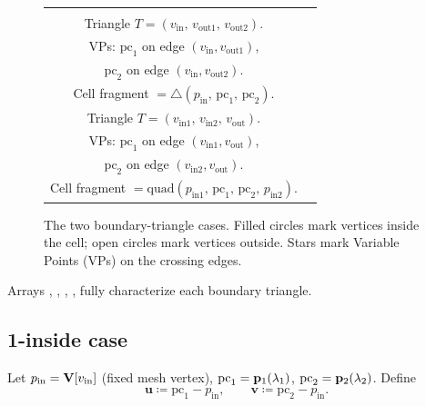 \documentclass[11pt,a4paper]{article}
\begin{document}
\begin{figure}[h]
\centering
\begin{tabular}{cc}
\begin{minipage}{0.45\textwidth}
\centering
\textit{1-inside:}\\[4pt]
Triangle $T = (v_\mathrm{in},\, v_\mathrm{out1},\, v_\mathrm{out2})$.\\
VPs: $\mathrm{pc}_1$ on edge $(v_\mathrm{in}, v_\mathrm{out1})$,\\
\phantom{VPs: }$\mathrm{pc}_2$ on edge $(v_\mathrm{in}, v_\mathrm{out2})$.\\[4pt]
Cell fragment $= \triangle(p_\mathrm{in},\, \mathrm{pc}_1,\, \mathrm{pc}_2)$.
\end{minipage}
&
\begin{minipage}{0.45\textwidth}
\centering
\textit{2-inside:}\\[4pt]
Triangle $T = (v_{\mathrm{in}1},\, v_{\mathrm{in}2},\, v_\mathrm{out})$.\\
VPs: $\mathrm{pc}_1$ on edge $(v_{\mathrm{in}1}, v_\mathrm{out})$,\\
\phantom{VPs: }$\mathrm{pc}_2$ on edge $(v_{\mathrm{in}2}, v_\mathrm{out})$.\\[4pt]
Cell fragment $= \mathrm{quad}(p_{\mathrm{in}1},\, \mathrm{pc}_1,\,
                               \mathrm{pc}_2,\, p_{\mathrm{in}2})$.
\end{minipage}
\end{tabular}
\caption{The two boundary-triangle cases.  Filled circles mark vertices
inside the cell; open circles mark vertices outside.  Stars mark Variable
Points (VPs) on the crossing edges.}
\label{fig:btri}
\end{figure}

\begin{tcolorbox}[colback=blue!4!white, colframe=blue!40!black,
                  title={Code: area arrays}, fontupper=\small]
Arrays , , ,
,  fully characterize each boundary
triangle.
\end{tcolorbox}

\subsection{1-inside case}
\label{sec:area-1inside}

Let $p_\mathrm{in} = \mathbf{V}[v_\mathrm{in}]$ (fixed mesh vertex),
$\mathrm{pc}_1 = \mathbf{p}_{1}(\lambda_1)$, $\mathrm{pc}_2 = \mathbf{p}_{2}(\lambda_2)$.
Define
\begin{equation}
  \mathbf{u} \coloneqq \mathrm{pc}_1 - p_\mathrm{in},\qquad
  \mathbf{v} \coloneqq \mathrm{pc}_2 - p_\mathrm{in}.
\end{equation}
\end{document}
